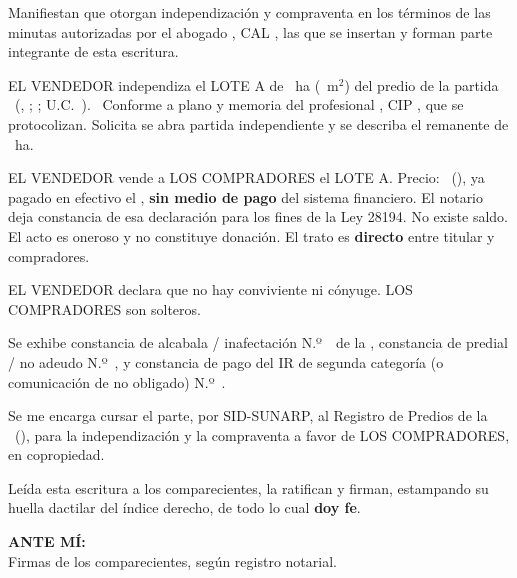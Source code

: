 \documentclass[12pt,a4paper]{article}
\begin{document}
Manifiestan que otorgan independización y compraventa en los términos de las minutas autorizadas por el abogado \AbogadoNombre, CAL \ColegiaturaAbogado, las que se insertan y forman parte integrante de esta escritura.

EL VENDEDOR independiza el LOTE A de \AreaIndependizarHa\ ha (\AreaIndependizarMetros\ m$^2$) del predio de la partida \PartidaMatriz\ (\OficinaRegistral, \ZonaRegistral; \UbicacionRegistral; U.C.\ \UnidadCatastral). \CriterioRecorte\ Conforme a plano y memoria del profesional \IngenieroNombre, CIP \IngenieroCIP, que se protocolizan. Solicita se abra partida independiente y se describa el remanente de \AreaRemanenteHa\ ha.

EL VENDEDOR vende a LOS COMPRADORES el LOTE A. Precio: \MontoPago\ (\MontoPagoLetras), ya pagado en efectivo el \FechaPago, \textbf{sin medio de pago} del sistema financiero. El notario deja constancia de esa declaración para los fines de la Ley 28194. No existe saldo. El acto es oneroso y no constituye donación. El trato es \textbf{directo} entre titular y compradores.

EL VENDEDOR declara que no hay conviviente ni cónyuge. LOS COMPRADORES son solteros.

Se exhibe constancia de alcabala / inafectación N.º\ \linea[3.2cm]\ de la \Municipalidad, constancia de predial / no adeudo N.º\ \linea[3.2cm], y constancia de pago del IR de segunda categoría (o comunicación de no obligado) N.º\ \linea[3.2cm].

Se me encarga cursar el parte, por SID-SUNARP, al Registro de Predios de la \OficinaRegistral\ (\ZonaRegistral), para la independización y la compraventa a favor de LOS COMPRADORES, en copropiedad.

Leída esta escritura a los comparecientes, la ratifican y firman, estampando su huella dactilar del índice derecho, de todo lo cual \textbf{doy fe}.

\vspace{0.9em}
\noindent \textbf{ANTE MÍ:}\\[0.15em]
Firmas de los comparecientes, según registro notarial.

\vspace{0.25em}
\end{document}
